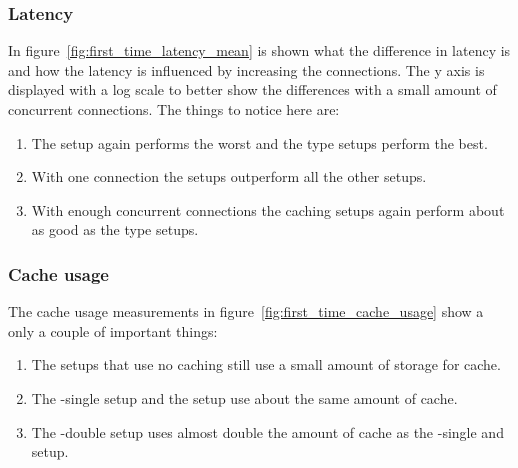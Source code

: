 \documentclass[twoside,openright]{uva-bachelor-thesis}
\begin{document}
\subsubsection{Latency}
In figure~\ref{fig:first_time_latency_mean} is shown what the difference in
latency is and how the latency is influenced by increasing the connections. The
y axis is displayed with a log scale to better show the differences with a small
amount of concurrent connections. The things to notice here are:
\begin{enumerate}
    \item
        The \ipp setup again performs the worst and the \cdn type setups perform
        the best.

    \item
        With one connection the \cdn setups outperform all the other setups.

    \item
        With enough concurrent connections the caching \lt setups again perform
        about as good as the \cdn type setups.



\end{enumerate}



\subsubsection{Cache usage}
The cache usage measurements in figure~\ref{fig:first_time_cache_usage} show a
only a couple of important things:
\begin{enumerate}
    \item
        The setups that use no caching still use a small amount of storage for
        cache.

    \item
        The \lt-single setup and the \cdn setup use about the same amount of
        cache.

    \item
        The \lt-double setup uses almost double the amount of cache as the
        \lt-single and \cdn setup.
\end{enumerate}


\FloatBarrier
\end{document}
